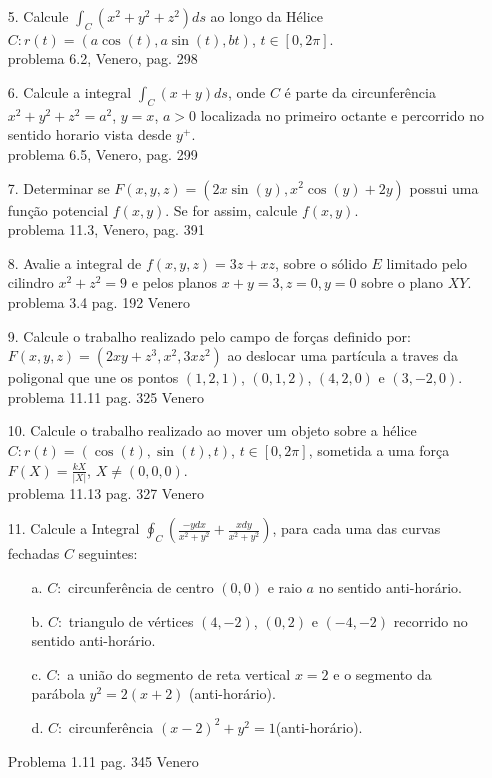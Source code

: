 \begin{itemize}
	\item[5.] Calcule $\int_{C} (x^{2}+y^{2}+z^{2})ds$ ao longo da Hélice $C: r(t)=(a \cos(t), a \sin (t),bt)$, $t\in [0,2\pi]$.\\
	problema 6.2, Venero, pag. 298	
\end{itemize}
\begin{itemize}
	\item[6.] Calcule a integral $\int_{C} (x+y)ds$, onde $C$ é parte da circunferência  $x^{2}+y^{2}+z^{2}=a^{2}$, $y=x$, $a>0$ localizada no primeiro octante e percorrido no sentido horario vista desde $y^{+}$.\\
    problema 6.5, Venero, pag. 299
\end{itemize}
\begin{itemize}
	\item[7.] Determinar se $F(x,y,z)=(2x\sin(y),x^{2}\cos (y)+2y)$ possui uma função potencial $f(x,y)$. Se for assim, calcule $f(x,y)$.\\
	problema 11.3, Venero, pag. 391
\end{itemize}
\begin{itemize}
	\item[8.] Avalie a integral de $f(x,y,z)=3z+xz$, sobre o sólido $E$ limitado pelo cilindro $x^{2}+z^{2}=9$ e pelos planos $x+y=3, z=0, y=0$ sobre o plano $XY$. 
	problema 3.4 pag. 192 Venero
\end{itemize}
\begin{itemize}
	\item[9.]Calcule o trabalho realizado pelo campo de forças definido por: $F(x,y,z)=(2xy+z^{3},x^{2},3xz^{2})$ ao deslocar uma partícula a traves da poligonal que une os pontos $(1,2,1)$, $(0,1,2)$, $(4,2,0)$ e $(3,-2,0)$.\\
	problema 11.11 pag. 325 Venero
\end{itemize}
\begin{itemize}
	\item[10.] Calcule o trabalho realizado ao mover um objeto sobre a hélice $C: r(t)=(\cos (t), \sin (t),t)$, $t\in [0,2\pi]$, sometida a uma força $F(X)=\frac{kX}{|X|}$, $X\neq (0,0,0)$.\\
	problema 11.13 pag. 327 Venero
\end{itemize}
\begin{itemize}
	\item [11.] Calcule a Integral $\oint_{C} (\frac{-ydx}{x^{2}+y^{2}}+\frac{xdy}{x^{2}+y^{2}})$, para cada uma das curvas fechadas $C$ seguintes:
	\begin{itemize}
		\item[a.] $C:$ circunferência de centro $(0,0)$ e raio $a$ no sentido anti-horário.	
		\item[b.] $C:$ triangulo de vértices $(4,-2)$, $(0,2)$ e $(-4,-2)$ recorrido no sentido anti-horário.
		\item[c.] $C:$ a união do segmento de reta vertical $x=2$ e o segmento da parábola $y^{2}=2(x+2)$ (anti-horário).
		\item[d.]  $C:$ circunferência $(x-2)^{2}+y^{2}=1$(anti-horário).		
	\end{itemize}
	Problema 1.11 pag. 345 Venero	
\end{itemize}
